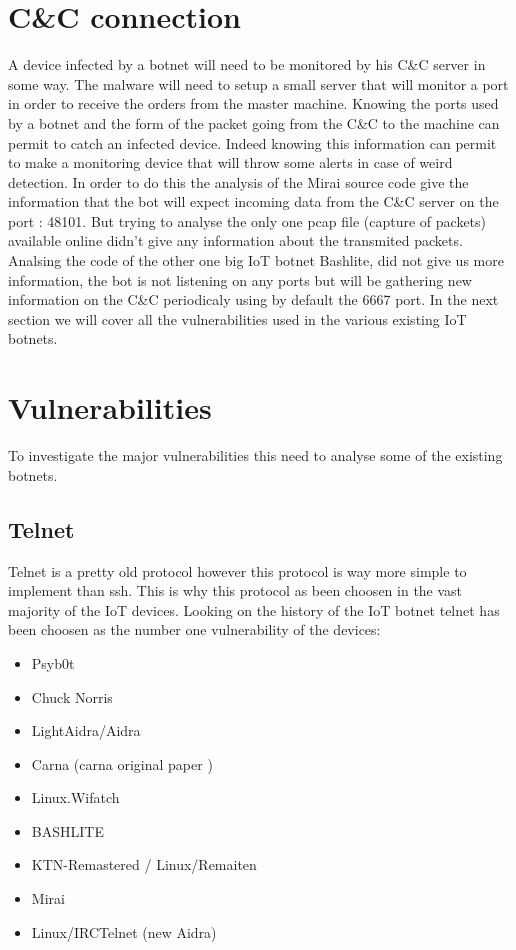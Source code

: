 \documentclass{report}
\begin{document}
\section{C\&C connection}
A device infected by a botnet will need to be monitored by his C\&C server in some way. The malware will need to setup a small server that will monitor a port in order to receive the orders from the master machine. Knowing the ports used by a botnet and the form of the packet going from the C\&C to the machine can permit to catch an infected device. Indeed knowing this information can permit to make a monitoring device that will throw some alerts in case of weird detection.\newline
In order to do this the analysis of the Mirai source code give the information that the bot will expect incoming data from the C\&C server on the port : 48101.
But trying to analyse the only one pcap file (capture of packets) available online didn't give any information about the transmited packets.
Analsing the code of the other one big IoT botnet Bashlite, did not give us more information, the bot is not listening on any ports but will be gathering new information on the C\&C periodicaly using by default the 6667 port.\newline
In the next section we will cover all the vulnerabilities used in the various existing IoT botnets. 

\section{Vulnerabilities}
\label{sec:vulnerabilities}
To investigate the major vulnerabilities this need to analyse some of the existing botnets.

\subsection{Telnet}
Telnet is a pretty old protocol \autocite{davidson1977arpanet} however this protocol is way more simple to implement than ssh. This is why this protocol as been choosen in the vast majority of the IoT devices. Looking on the history of the IoT botnet telnet has been choosen as the number one vulnerability of the devices:

\begin{itemize}
 \item Psyb0t \autocite{durfina2013psybot}
 \item Chuck Norris \autocite{celeda2010embedded}
 \item LightAidra/Aidra \autocite{aidra}
 \item Carna \autocite{krenc2014internet} (carna original paper \autocite{carna})
 \item Linux.Wifatch \autocite{wifatch}
 \item BASHLITE \autocite{bashlite}
 \item KTN-Remastered / Linux/Remaiten \autocite{remaiten}
 \item Mirai \autocite{kolias2017ddos}
 \item Linux/IRCTelnet (new Aidra) \autocite{irctelnet}
\end{itemize}
\end{document}
